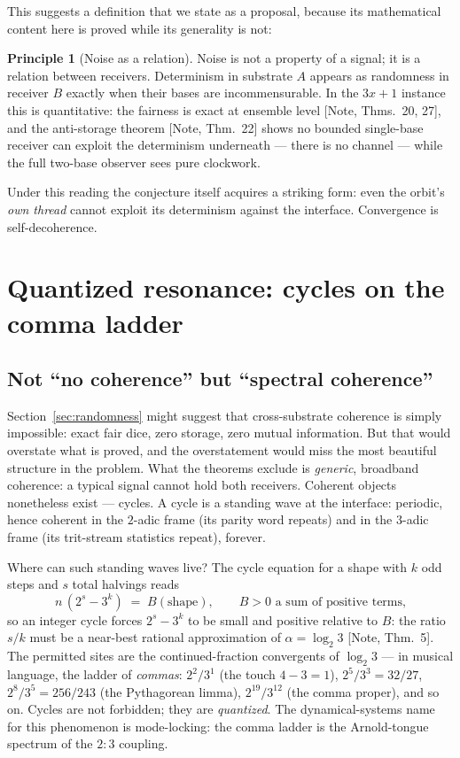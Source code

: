 \documentclass[11pt]{article}
\theoremstyle{definition}
\newtheorem{principle}[theorem]{Principle}
\theoremstyle{remark}
\newcommand{\anchor}[1]{\textup{[#1]}}
\begin{document}
This suggests a definition that we state as a proposal, because its
mathematical content here is proved while its generality is not:

\begin{principle}[Noise as a relation]
\label{prin:noise}
Noise is not a property of a signal; it is a relation between receivers.
Determinism in substrate $A$ appears as randomness in receiver $B$ exactly
when their bases are incommensurable. In the $3x+1$ instance this is
quantitative: the fairness is exact at ensemble level \anchor{Note,
Thms.~20, 27}, and the anti-storage theorem \anchor{Note, Thm.~22} shows no
bounded single-base receiver can exploit the determinism underneath ---
there is no channel --- while the full two-base observer sees pure clockwork.
\end{principle}

Under this reading the conjecture itself acquires a striking form: even the
orbit's \emph{own thread} cannot exploit its determinism against the
interface. Convergence is self-decoherence.

\section{Quantized resonance: cycles on the comma ladder}
\label{sec:resonance}

\subsection{Not ``no coherence'' but ``spectral coherence''}

Section~\ref{sec:randomness} might suggest that cross-substrate coherence is
simply impossible: exact fair dice, zero storage, zero mutual information.
But that would overstate what is proved, and the overstatement would miss the
most beautiful structure in the problem. What the theorems exclude is
\emph{generic}, broadband coherence: a typical signal cannot hold both
receivers. Coherent objects nonetheless exist --- cycles. A cycle is a
standing wave at the interface: periodic, hence coherent in the $2$-adic frame
(its parity word repeats) and in the $3$-adic frame (its trit-stream
statistics repeat), forever.

Where can such standing waves live? The cycle equation for a shape with $k$
odd steps and $s$ total halvings reads
\[
n \,(2^{s} - 3^{k}) \;=\; B(\text{shape}), \qquad B > 0
\text{ a sum of positive terms,}
\]
so an integer cycle forces $2^s - 3^k$ to be small and positive relative to
$B$: the ratio $s/k$ must be a near-best rational approximation of
$\alpha = \log_2 3$ \anchor{Note, Thm.~5}. The permitted sites are the
continued-fraction convergents of $\log_2 3$ --- in musical language, the
ladder of \emph{commas}: $2^2/3^1$ (the touch $4-3=1$), $2^5/3^3 = 32/27$,
$2^8/3^5 = 256/243$ (the Pythagorean limma), $2^{19}/3^{12}$ (the comma
proper), and so on. Cycles are not forbidden; they are \emph{quantized}. The
dynamical-systems name for this phenomenon is mode-locking: the comma ladder
is the Arnold-tongue spectrum \cite{Arnold1965} of the $2{:}3$ coupling.
\end{document}
